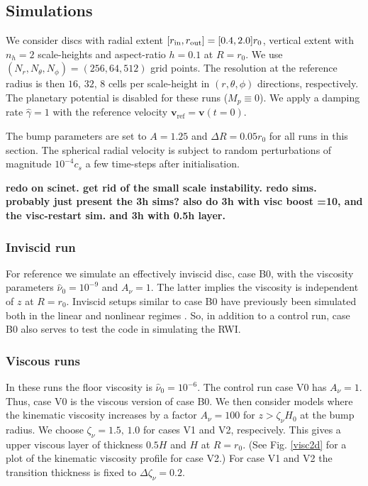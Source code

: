 \subsection{Simulations}
We consider discs with radial extent $[r_\mathrm{in},r_\mathrm{out}]=[0.4,2.0]r_0$,
vertical extent with $n_h=2$ scale-heights and aspect-ratio $h=0.1$ at
$R=r_0$. We use $(N_r, N_\theta,
N_\phi)=(256,64,512)$ grid points. 
The resolution at the reference radius is then
$16,\,32,\,8$ cells per scale-height in $(r,\theta,\phi)$ directions,
respectively. The planetary potential is disabled for these runs
($M_p\equiv 0$). We apply a damping rate $\hat{\gamma}=1$ with the
reference velocity $\bm{v}_\mathrm{ref}=\bm{v}(t=0)$.     

The bump parameters are set to $A=1.25$ and $\Delta R = 0.05r_0$ for
all runs in this section. The spherical radial velocity is subject 
to random perturbations of magnitude $10^{-4}c_s$ 
a few time-steps after initialisation. 

{\bf redo on scinet. get rid of the small scale instability. redo
  sims. probably just present the 3h sims? also do 3h with visc boost =10,
  and the visc-restart sim. and 3h with 0.5h layer. }

\subsubsection{Inviscid run}
For reference we simulate an effectively inviscid disc, case B0,
with the viscosity parameters $\hat{\nu}_0=10^{-9}$ and $A_\nu = 1$.  
The latter implies the viscosity is independent of $z$ at $R=r_0$.   
Inviscid setups similar to case B0 have previously been simulated
both in the linear and nonlinear regimes  \citep{meheut12, lin13}. So,
in addition to a control run, case B0 also serves to test the \pluto
code in simulating the RWI.    

\subsubsection{Viscous runs}
In these runs the floor viscosity is 
$\hat{\nu}_0=10^{-6}$. The control run case V0 has $A_\nu =
1$. Thus, case V0 is the viscous version of case B0.  
We then consider models where the kinematic viscosity increases by
a factor $A_\nu=100$ for $z>\zeta_\nu H_0$ at the bump radius. We
choose $\zeta_\nu=1.5,\,1.0$ for cases V1 and V2, respecively.  This gives a upper 
viscous layer of thickness $0.5H$ and $H$ at $R=r_0$. (See
Fig. \ref{visc2d} for a plot of the kinematic viscosity profile for case V2.) 
For case V1 and V2 the transition thickness is fixed to
$\Delta\zeta_\nu=0.2$.  
 
